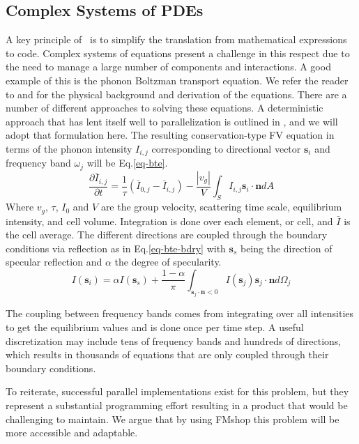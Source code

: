 \documentclass[twoside,leqno,twocolumn]{article}
\begin{document}
\subsection{Complex Systems of PDEs}
A key principle of \FMshop\ is to simplify the translation from mathematical expressions to code. Complex systems of equations present a challenge in this respect due to the need to manage a large number of components and interactions. A good example of this is the phonon Boltzman transport equation. We refer the reader to \cite{bte2} and \cite{bte3} for the physical background and derivation of the equations. There are a number of different approaches to solving these equations. A deterministic approach that has lent itself well to parallelization is outlined in \cite{bte}, and we will adopt that formulation here. The resulting conservation-type FV equation in terms of the phonon intensity $I_{i,j}$ corresponding to directional vector $\textbf{s}_{i}$ and frequency band $\omega_{j}$ will be Eq.\ref{eq-bte}.
\begin{equation}
\label{eq-bte}
\frac{\partial \bar{I}_{i,j}}{\partial t} = \frac{1}{\tau}(\bar{I}_{0,j} - \bar{I}_{i,j}) - \frac{|v_{g}|}{V} \int_{S} I_{i,j} \textbf{s}_{i}\cdot \textbf{n} dA
\end{equation}
Where $v_{g}$, $\tau$, $I_0$ and $V$ are the group velocity, scattering time scale, equilibrium intensity, and cell volume. Integration is done over each element, or cell, and $\bar{I}$ is the cell average. The different directions are coupled through the boundary conditions via reflection as in Eq.\ref{eq-bte-bdry} with $\textbf{s}_{s}$ being the direction of specular reflection and $\alpha$ the degree of specularity.
\begin{equation}
\label{eq-bte-bdry}
I(\textbf{s}_{i}) = \alpha I(\textbf{s}_{s}) + \frac{1-\alpha}{\pi}\int_{\textbf{s}_{j}\cdot\textbf{n}<0} I(\textbf{s}_{j}) \textbf{s}_{j}\cdot\textbf{n} d\Omega_{j}
\end{equation}

The coupling between frequency bands comes from integrating over all intensities to get the equilibrium values and is done once per time step. A useful discretization may include tens of frequency bands and hundreds of directions\cite{bte}, which results in thousands of equations that are only coupled through their boundary conditions. 

To reiterate, successful parallel implementations exist for this problem, but they represent a substantial programming effort resulting in a product that would be challenging to maintain. We argue that by using FMshop this problem will be more accessible and adaptable.
\end{document}
